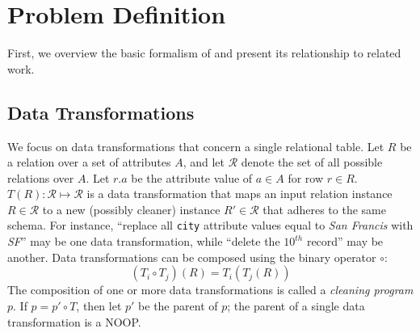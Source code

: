 \section{Problem Definition}
First, we overview the basic formalism of \sys and present its relationship to related work.

\subsection{Data Transformations}
We focus on data transformations that concern a single relational table. 
Let $R$ be a relation over a set of attributes $A$, and let $\mathcal{R}$ denote the set of all possible relations over $A$.
Let $r.a$ be the attribute value of $a \in A$ for row $r \in R$.
$T(R): \mathcal{R} \mapsto \mathcal{R}$ is a data transformation that maps an input relation instance $R \in \mathcal{R}$ to a new (possibly cleaner) instance $R' \in \mathcal{R}$ that adheres to the same schema.  For instance, ``replace all \texttt{city} attribute values equal to {\it San Francis} with {\it SF}'' may be one data transformation, while ``delete the $10^{th}$ record'' may be another.   Data transformations can be composed using the binary operator $\circ$:
\[
(T_i \circ T_j)(R) =  T_i(T_j(R))
\]
The composition of one or more data transformations is called a {\it cleaning program} $p$.   If $p = p' \circ T$, then let $p'$ be the parent of $p$; the parent of a single data transformation is a NOOP.  

